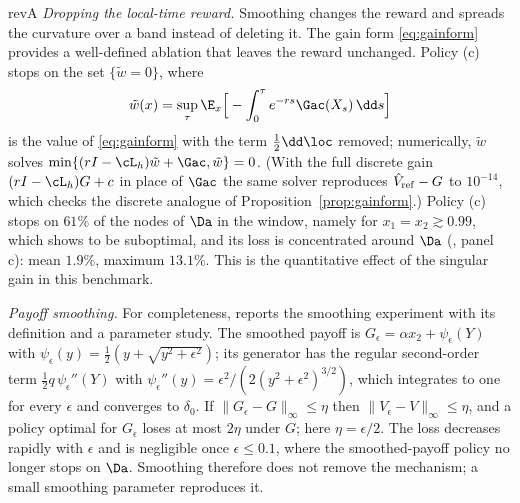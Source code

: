 \begin{rv}{revA}{}
\emph{Dropping the local-time reward.} Smoothing changes the reward and spreads the curvature over a
band instead of deleting it. The gain form \eqref{eq:gainform} provides a well-defined ablation
that leaves the reward unchanged. Policy (c) stops on the set $\{\tilde w=0\}$, where
\[
\tilde w(x)=\sup_\tau\E_x\Big[-\int_0^\tau e^{-rs}\Gac(X_s)\,\dd s\Big]
\]
is the value of \eqref{eq:gainform} with the term $\tfrac12\dd\loc$ removed; numerically, $\tilde w$
solves $\min\{(rI-\cL_h)\tilde w+\Gac,\tilde w\}=0$. (With the full discrete gain
$(rI-\cL_h)G+c$ in place of $\Gac$ the same solver reproduces $\hat V_{\rm ref}-G$ to $10^{-14}$,
which checks the discrete analogue of Proposition~\ref{prop:gainform}.) Policy (c) stops on $61\%$ of the
nodes of $\Da$ in the window, namely for $x_1=x_2\gtrsim0.99$, which  shows to be
suboptimal, and its loss is concentrated around $\Da$ (, panel c): mean $1.9\%$,
maximum $13.1\%$. This is the quantitative effect of the singular gain in this benchmark.

\emph{Payoff smoothing.} For completeness,  reports the smoothing experiment
with its definition and a parameter study. The smoothed payoff is
$G_\epsilon=\alpha x_2+\psi_\epsilon(Y)$ with $\psi_\epsilon(y)=\tfrac12(y+\sqrt{y^2+\epsilon^2})$;
its generator has the regular second-order term $\tfrac12q\,\psi_\epsilon''(Y)$ with
$\psi_\epsilon''(y)=\epsilon^2/(2(y^2+\epsilon^2)^{3/2})$, which integrates to one for every
$\epsilon$ and converges to $\delta_0$. If $\|G_\epsilon-G\|_\infty\le\eta$ then
$\|V_\epsilon-V\|_\infty\le\eta$, and a policy optimal for $G_\epsilon$ loses at most $2\eta$ under
$G$; here $\eta=\epsilon/2$. The loss decreases rapidly with $\epsilon$ and is negligible once $\epsilon\le0.1$, where the smoothed-payoff policy no longer stops on $\Da$. Smoothing therefore does not remove the mechanism; a small smoothing parameter reproduces it. 
\end{rv}

